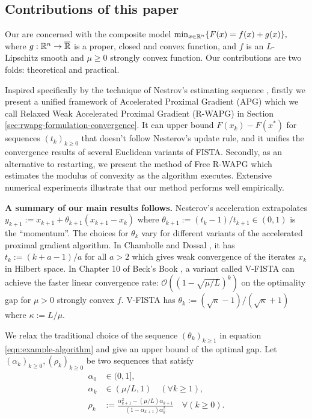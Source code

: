\documentclass[12pt]{article}
\begin{document}
    \subsection{Contributions of this paper}
        Our are concerned with the composite model
        $\min_{x\in\mathbb R^n}\{F(x)= f(x) + g(x)\},$ 
        where $g:\mathbb R^n \rightarrow \overline{\mathbb R}$ is a proper,  closed and convex function, and $f$ is an $L$-Lipschitz smooth and $\mu \ge 0$ strongly convex function.
        Our contributions are two folds: theoretical and practical.
        \par
        Inspired specifically by the technique of Nestrov's estimating sequence \cite{nesterov_lectures_2018}, firstly we present a unified framework of Accelerated Proximal Gradient (APG) which we call Relaxed Weak Accelerated Proximal Gradient (R-WAPG) in Section \ref{sec:rwapg-formulation-convergence}.
        It can upper bound $F(x_k) - F(x^*)$ for sequences $(t_k)_{k \ge 0}$ that doesn't follow Nesterov's update rule, and it unifies the convergence results of several Euclidean variants of FISTA.
        Secondly, as an alternative to restarting, we present the method of Free R-WAPG which estimates the modulus of convexity as the algorithm executes. Extensive numerical experiments illustrate that our method performs well empirically.
        \par
        \textbf{A summary of our main results follows. }
        Nesterov's acceleration extrapolates $y_{k + 1} := x_{k + 1} + \theta_{k + 1}(x_{k + 1} - x_k)$ where $\theta_{k + 1} := (t_{k} - 1)/t_{k + 1} \in (0, 1)$ is the ``momentum''.
        The choices for $\theta_k$ vary for different variants of the accelerated proximal gradient algorithm.
        In Chambolle and Dossal \cite{chambolle_convergence_2015}, it has $t_k := (k + a - 1)/a$ for all $a > 2$ which gives weak convergence of the iterates $x_k$ in Hilbert space.
        In Chapter 10 of Beck's Book \cite{beck_first-order_2017}, a variant called V-FISTA can achieve the faster linear convergence rate: $\mathcal O((1 - \sqrt{\mu/L})^k)$ on the optimality gap for $\mu > 0$ strongly convex $f$.
        V-FISTA has $\theta_k := (\sqrt{\kappa} - 1)/(\sqrt{\kappa} + 1)$ where $\kappa := L/\mu$.
        \par
        We relax the traditional choice of the sequence $(\theta_k)_{k\geq 1}$ in equation \eqref{eqn:example-algorithm} and give an upper bound of the optimal gap.
        Let $(\alpha_k)_{k \ge0}, (\rho_k)_{k \ge 0}$ be two sequences that satisfy
        \begin{align*}
            \alpha_0 &\in (0, 1],
            \\
            \alpha_k &\in (\mu/L, 1) \quad (\forall k \ge 1),
            \\
            \rho_k &:= \frac{\alpha_{k + 1}^2 - (\mu/L)\alpha_{k + 1}}{(1 - \alpha_{k + 1})\alpha_k^2} \quad \forall (k \ge 0).
        \end{align*}
\end{document}
